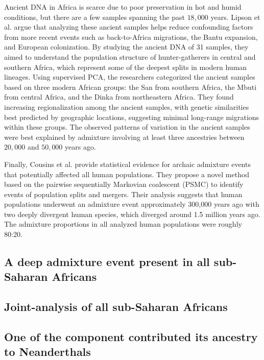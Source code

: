 Ancient DNA in Africa is scarce due to poor preservation in hot and humid conditions, but there are a few samples spanning the past $18{,}000$ years. Lipson et al. \cite{lipson2022ancient} argue that analyzing these ancient samples helps reduce confounding factors from more recent events such as back-to-Africa migrations, the Bantu expansion, and European colonization. By studying the ancient DNA of 31 samples, they aimed to understand the population structure of hunter-gatherers in central and southern Africa, which represent some of the deepest splits in modern human lineages. Using supervised PCA, the researchers categorized the ancient samples based on three modern African groups: the San from southern Africa, the Mbuti from central Africa, and the Dinka from northeastern Africa. They found increasing regionalization among the ancient samples, with genetic similarities best predicted by geographic locations, suggesting minimal long-range migrations within these groups. The observed patterns of variation in the ancient samples were best explained by admixture involving at least three ancestries between $20{,}000$ and $50{,}000$ years ago.

Finally, Cousins et al. \cite{cousins2024structured} provide statistical evidence for archaic admixture events that potentially affected all human populations. They propose a novel method based on the pairwise sequentially Markovian coalescent (PSMC) to identify events of population splits and mergers. Their analysis suggests that human populations underwent an admixture event approximately 300,000 years ago with two deeply divergent human species, which diverged around 1.5 million years ago. The admixture proportions in all analyzed human populations were roughly 80:20.

\subsection{A deep admixture event present in all sub-Saharan Africans}


\subsection{Joint-analysis of all sub-Saharan Africans}


\subsection{One of the component contributed its ancestry to Neanderthals}

